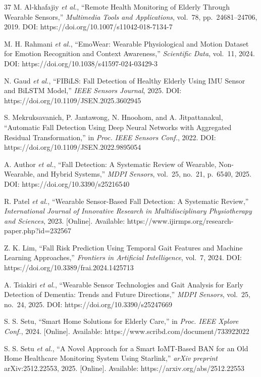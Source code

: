 \documentclass[conference]{IEEEtran}
\begin{document}
\begin{thebibliography}{37}
M. Al-khafajiy \textit{et al.}, ``Remote Health Monitoring of Elderly Through Wearable Sensors,'' \textit{Multimedia Tools and Applications}, vol.~78, pp.~24681--24706, 2019. DOI: https://doi.org/10.1007/s11042-018-7134-7

M. H. Rahmani \textit{et al.}, ``EmoWear: Wearable Physiological and Motion Dataset for Emotion Recognition and Context Awareness,'' \textit{Scientific Data}, vol.~11, 2024. DOI: https://doi.org/10.1038/s41597-024-03429-3

N. Gaud \textit{et al.}, ``FIBiLS: Fall Detection of Healthy Elderly Using IMU Sensor and BiLSTM Model,'' \textit{IEEE Sensors Journal}, 2025. DOI: https://doi.org/10.1109/JSEN.2025.3602945

S. Mekruksavanich, P. Jantawong, N. Hnoohom, and A. Jitpattanakul, ``Automatic Fall Detection Using Deep Neural Networks with Aggregated Residual Transformation,'' in \textit{Proc. IEEE Sensors Conf.}, 2022. DOI: https://doi.org/10.1109/JSEN.2022.9895054

A. Author \textit{et al.}, ``Fall Detection: A Systematic Review of Wearable, Non-Wearable, and Hybrid Systems,'' \textit{MDPI Sensors}, vol.~25, no.~21, p.~6540, 2025. DOI: https://doi.org/10.3390/s25216540

R. Patel \textit{et al.}, ``Wearable Sensor-Based Fall Detection: A Systematic Review,'' \textit{International Journal of Innovative Research in Multidisciplinary Physiotherapy and Sciences}, 2023. [Online]. Available: https://www.ijirmps.org/research-paper.php?id=232567

Z. K. Lim, ``Fall Risk Prediction Using Temporal Gait Features and Machine Learning Approaches,'' \textit{Frontiers in Artificial Intelligence}, vol.~7, 2024. DOI: https://doi.org/10.3389/frai.2024.1425713

A. Tsiakiri \textit{et al.}, ``Wearable Sensor Technologies and Gait Analysis for Early Detection of Dementia: Trends and Future Directions,'' \textit{MDPI Sensors}, vol.~25, no.~24, 2025. DOI: https://doi.org/10.3390/s25247669

S. S. Setu, ``Smart Home Solutions for Elderly Care,'' in \textit{Proc. IEEE Xplore Conf.}, 2024. [Online]. Available: https://www.scribd.com/document/733922022

S. S. Setu \textit{et al.}, ``A Novel Approach for a Smart IoMT-Based BAN for an Old Home Healthcare Monitoring System Using Starlink,'' \textit{arXiv preprint} arXiv:2512.22553, 2025. [Online]. Available: https://arxiv.org/abs/2512.22553


\end{thebibliography}
\end{document}
